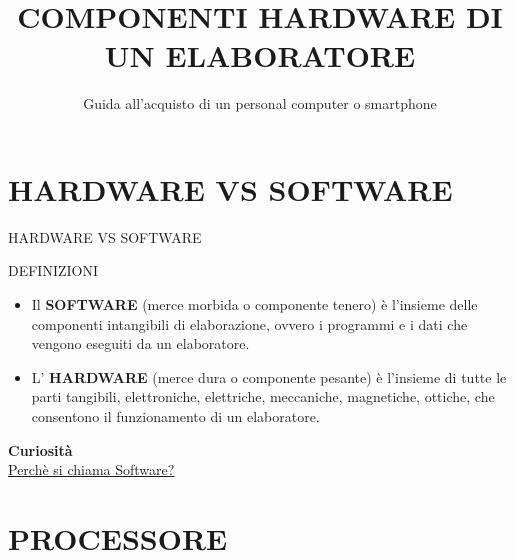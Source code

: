 \documentclass[aspectratio=1610]{beamer}
\title{COMPONENTI HARDWARE DI UN ELABORATORE}
\subtitle{Guida all'acquisto di un personal computer o smartphone}
\date{}
\institute{\textit{
        Fonti:
        \begin{itemize}
            \item[-] \href{https://it.wikipedia.org/wiki/Hardware}{Wikipedia}
            \item[-] \href{https://catalogo.sanoma.it/si-op-104157-dal-bit-all-intelligenza-artificiale.html}{Dal BIT all'INTELLIGENZA ARTIFICIALE}
        \end{itemize}
    }
}
\begin{document}
\begin{frame}
    \titlepage
\end{frame}

\section{HARDWARE VS SOFTWARE}

\begin{frame}{HARDWARE VS SOFTWARE}
    \begin{alertblock}{DEFINIZIONI}
        \begin{minipage}{0.98\linewidth}
            \begin{itemize}
                \justifying
                \item Il \textbf{SOFTWARE} (merce morbida o componente tenero) è l'insieme delle componenti intangibili 
                di elaborazione, ovvero i programmi e i dati che vengono eseguiti da un elaboratore.
                \pause
                \item L' \textbf{HARDWARE} (merce dura o componente pesante) è l'insieme di tutte le parti tangibili, 
                elettroniche, elettriche, meccaniche, magnetiche, ottiche, che consentono il funzionamento 
                di un elaboratore.
            \end{itemize}
            \bigskip
            \tiny{\textbf{Curiosità}}\\
            \tiny{\href{https://www.focus.it/tecnologia/digital-life/perche-il-software-si-chiama-cosi}{Perchè si chiama Software?}}
        \end{minipage}
    \end{alertblock}
\end{frame}

\section{PROCESSORE}
\end{document}
